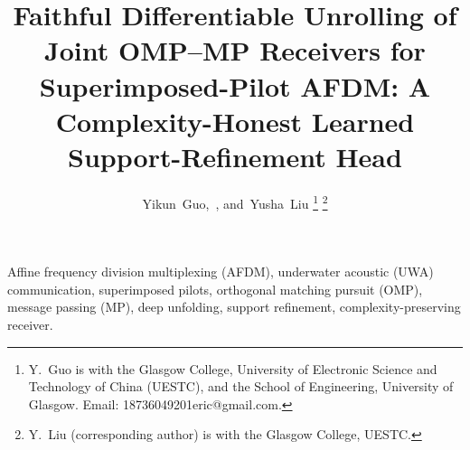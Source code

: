 \documentclass[journal]{IEEEtran}
\begin{document}
\title{Faithful Differentiable Unrolling of Joint OMP--MP Receivers for Superimposed-Pilot AFDM: A Complexity-Honest Learned Support-Refinement Head}

\author{%
  Yikun~Guo,~,
  and~Yusha~Liu%
  \thanks{Y.~Guo is with the Glasgow College, University of Electronic Science and Technology of China (UESTC), and the School of Engineering, University of Glasgow. Email: 18736049201eric@gmail.com.}%
  \thanks{Y.~Liu (corresponding author) is with the Glasgow College, UESTC.}%
}


\maketitle

\begin{abstract}

\end{abstract}

\begin{IEEEkeywords}
Affine frequency division multiplexing (AFDM), underwater acoustic (UWA) communication, superimposed pilots, orthogonal matching pursuit (OMP), message passing (MP), deep unfolding, support refinement, complexity-preserving receiver.
\end{IEEEkeywords}








\appendices




\end{document}
